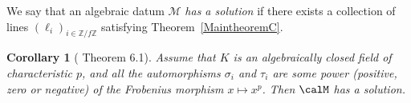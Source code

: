 \documentclass[12pt]{amsart}
\newtheorem{corollary}[theorem]{Corollary}
\theoremstyle{definition}
\newtheorem{remark}[theorem]{Remark}
\newcommand{\<}{\langle}   %
\renewcommand{\>}{\rangle} %
\begin{document}

We say that an algebraic datum $\mathcal M$ \textit{has a solution} if there exists a collection of lines $(\ell_i)_{i \in \mathbb Z/f\mathbb Z}$ satisfying Theorem~\ref{MaintheoremC}. 

\begin{corollary}[\cite{kottwitzrapoport:2003} Theorem 6.1] \label{TheoremKottwitzRapoport}
Assume that $K$ is an algebraically closed field of characteristic $p$, and all the automorphisms $\sigma_i$ and $\tau_i$ are some power (positive, zero or negative) of the Frobenius morphism $x \mapsto x^p$. Then $\calM$ has a solution.   
\end{corollary}


\end{document}
